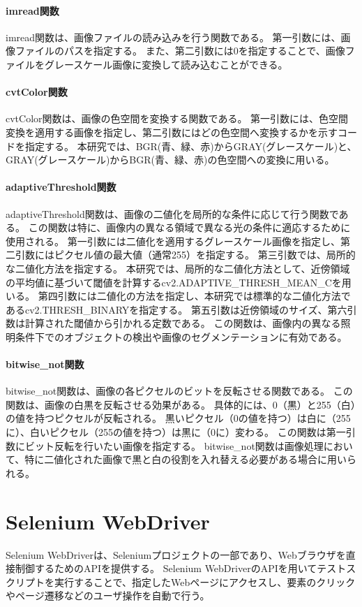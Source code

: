 \paragraph{imread関数}
imread関数は、画像ファイルの読み込みを行う関数である。
第一引数には、画像ファイルのパスを指定する。
また、第二引数には0を指定することで、画像ファイルをグレースケール画像に変換して読み込むことができる。
\paragraph{cvtColor関数}
cvtColor関数は、画像の色空間を変換する関数である。
第一引数には、色空間変換を適用する画像を指定し、第二引数にはどの色空間へ変換するかを示すコードを指定する。
本研究では、BGR(青、緑、赤)からGRAY(グレースケール)と、GRAY(グレースケール)からBGR(青、緑、赤)の色空間への変換に用いる。
\paragraph{adaptiveThreshold関数}
adaptiveThreshold関数は、画像の二値化を局所的な条件に応じて行う関数である。
この関数は特に、画像内の異なる領域で異なる光の条件に適応するために使用される。
第一引数には二値化を適用するグレースケール画像を指定し、第二引数にはピクセル値の最大値（通常255）を指定する。
第三引数では、局所的な二値化方法を指定する。
本研究では、局所的な二値化方法として、近傍領域の平均値に基づいて閾値を計算するcv2.ADAPTIVE\_THRESH\_MEAN\_Cを用いる。
第四引数には二値化の方法を指定し、本研究では標準的な二値化方法であるcv2.THRESH\_BINARYを指定する。
第五引数は近傍領域のサイズ、第六引数は計算された閾値から引かれる定数である。
この関数は、画像内の異なる照明条件下でのオブジェクトの検出や画像のセグメンテーションに有効である。
\paragraph{bitwise\_not関数}
bitwise\_not関数は、画像の各ピクセルのビットを反転させる関数である。
この関数は、画像の白黒を反転させる効果がある。
具体的には、0（黒）と255（白）の値を持つピクセルが反転される。
黒いピクセル（0の値を持つ）は白に（255に）、白いピクセル（255の値を持つ）は黒に（0に）変わる。
この関数は第一引数にビット反転を行いたい画像を指定する。
bitwise\_not関数は画像処理において、特に二値化された画像で黒と白の役割を入れ替える必要がある場合に用いられる。

\section{Selenium WebDriver}\label{sec:Selenium_WebDriver}
Selenium WebDriver\cite{Selenium WebDriver}は、Seleniumプロジェクト\cite{Selenium}の一部であり、Webブラウザを直接制御するためのAPIを提供する。
Selenium WebDriverのAPIを用いてテストスクリプトを実行することで、指定したWebページにアクセスし、要素のクリックやページ遷移などのユーザ操作を自動で行う。
